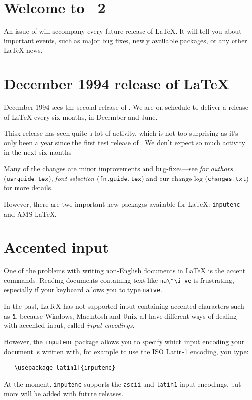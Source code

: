 \documentclass{ltnews}
\providecommand\pkg[1]{\texttt{#1}}
\begin{document}
\maketitle

\section{Welcome to \LaTeXNews~2}

An issue of \emph{\LaTeXNews} will accompany every future release of
\LaTeX.  It will tell you about important events, such as major bug
fixes, newly available packages, or any other \LaTeX{} news.

\section{December 1994 release of \LaTeX}

December 1994 sees the second release of \LaTeXe.  We are on schedule
to deliver a release of \LaTeX{} every six months, in December and
June.

Thisx release has seen quite a lot of activity, which is not too
surprising as it's only been a year since the first test release of
\LaTeXe.  We don't expect so much activity in the next six months.

Many of the changes are minor improvements and bug-fixes---see
\emph{\LaTeXe{} for authors} (\verb|usrguide.tex|), \emph{\LaTeXe{}
font selection} (\verb|fntguide.tex|) and our change log
(\verb|changes.txt|) for more details.

However, there are two important new packages available for \LaTeX:
\pkg{inputenc} and AMS-\LaTeX.

\section{Accented input}

One of the problems with writing non-English documents in \LaTeX{} is
the accent commands.  Reading documents containing text like
\verb|na\"\i ve| is frustrating, especially if your keyboard allows
you to type \texttt{na\"\i ve}.

In the past, \LaTeX{} has not supported input containing accented
characters such as \texttt{\"\i}, because Windows, Macintosh and Unix
all have different ways of dealing with accented input, called
\emph{input encodings}.

However, the \verb|inputenc| package allows you to specify which input
encoding your document is written with, for example to use the ISO
Latin-1 encoding, you type:
\begin{verbatim}
   \usepackage[latin1]{inputenc}
\end{verbatim}
At the moment, \verb|inputenc| supports the \verb|ascii| and
\verb|latin1| input encodings, but more will be added with future
releases.
\end{document}
